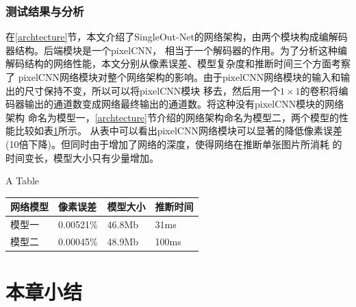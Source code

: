 \subsubsection{测试结果与分析}
	 在\ref{archtecture}节，本文介绍了SingleOut-Net的网络架构，由两个模块构成编解码器结构。后端模块是一个pixelCNN，
	 相当于一个解码器的作用。为了分析这种编解码结构的网络性能，本文分别从像素误差、模型复杂度和推断时间三个方面考察了
	 pixelCNN网络模块对整个网络架构的影响。由于pixelCNN网络模块的输入和输出的尺寸保持不变，所以可以将pixelCNN模块
	 移去，然后用一个$1\times1$的卷积将编码器输出的通道数变成网络最终输出的通道数。将这种没有pixelCNN模块的网络架构
	 命名为模型一，\ref{archtecture}节介绍的网络架构命名为模型二，两个模型的性能比较如表\ref{tab:performance}所示。
	 从表中可以看出pixelCNN网络模块可以显著的降低像素误差(10倍下降)。但同时由于增加了网络的深度，使得网络在推断单张图片所消耗
	 的时间变长，模型大小只有少量增加。
\begin{table}[!hpb]
	\centering
    {A Table}
	\label{tab:performance}
	\begin{tabular}{llll}
	\toprule
	网络模型 & 像素误差 & 模型大小 & 推断时间 \\
	\midrule
	模型一 &  0.00521\% & 46.8Mb & 31ms \\
	模型二 & 0.00045\% & 48.9Mb & 100ms \\
	\bottomrule
\end{tabular}
\end{table}
	 
\section{本章小结}
	
	


